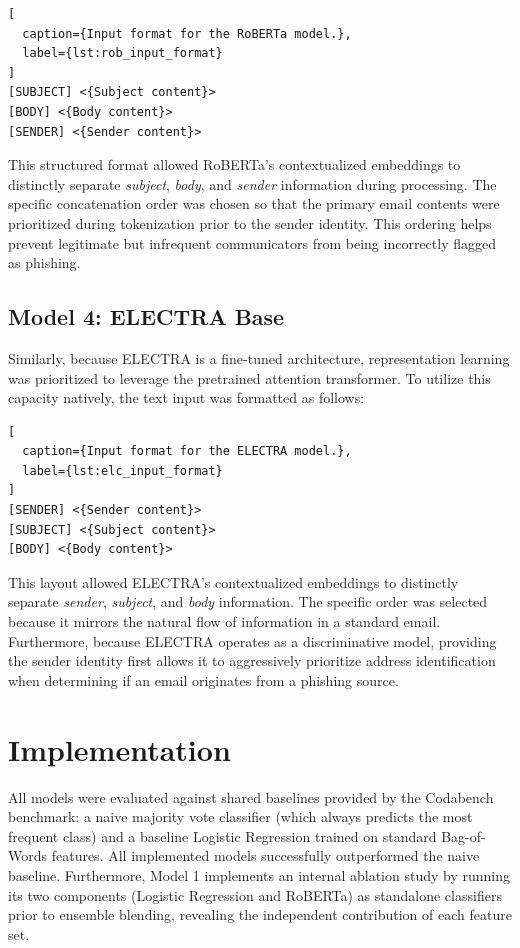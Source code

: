 \documentclass[11pt]{article}
\begin{document}
\begin{lstlisting}[
  caption={Input format for the RoBERTa model.},
  label={lst:rob_input_format}
]
[SUBJECT] <{Subject content}>
[BODY] <{Body content}>
[SENDER] <{Sender content}>
\end{lstlisting}

This structured format allowed RoBERTa's contextualized embeddings to distinctly separate \textit{subject}, \textit{body}, and \textit{sender} information during processing. The specific concatenation order was chosen so that the primary email contents were prioritized during tokenization prior to the sender identity. This ordering helps prevent legitimate but infrequent communicators from being incorrectly flagged as phishing.

\subsection{Model 4: ELECTRA Base}
Similarly, because ELECTRA is a fine-tuned architecture, representation learning was prioritized to leverage the pretrained attention transformer. To utilize this capacity natively, the text input was formatted as follows:

\begin{lstlisting}[
  caption={Input format for the ELECTRA model.},
  label={lst:elc_input_format}
]
[SENDER] <{Sender content}>
[SUBJECT] <{Subject content}>
[BODY] <{Body content}>
\end{lstlisting}

This layout allowed ELECTRA's contextualized embeddings to distinctly separate \textit{sender}, \textit{subject}, and \textit{body} information. The specific order was selected because it mirrors the natural flow of information in a standard email. Furthermore, because ELECTRA operates as a discriminative model, providing the sender identity first allows it to aggressively prioritize address identification when determining if an email originates from a phishing source.

\section{Implementation}

All models were evaluated against shared baselines provided by the Codabench benchmark: a naive majority vote classifier (which always predicts the most frequent class) and a baseline Logistic Regression trained on standard Bag-of-Words features. All implemented models successfully outperformed the naive baseline. Furthermore, Model 1 implements an internal ablation study by running its two components (Logistic Regression and RoBERTa) as standalone classifiers prior to ensemble blending, revealing the independent contribution of each feature set.
\end{document}
